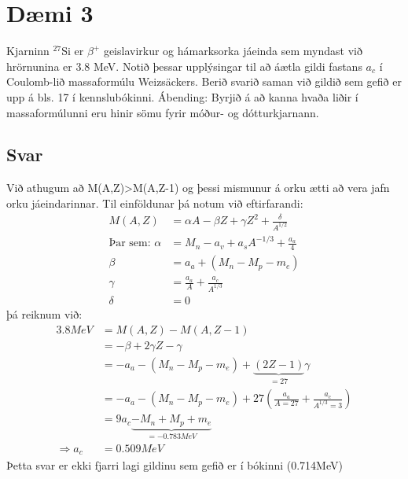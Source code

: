 \documentclass[11pt]{article}
\newcommand{\explain}[2]{\underbrace{#1}_\textrm{$#2$}}
\begin{document}
\section*{Dæmi 3}
Kjarninn $^27$Si er $β^+$ geislavirkur og hámarksorka jáeinda sem myndast við hrörnunina er 3.8 MeV. Notið þessar upplýsingar til að áætla gildi fastans $a_c$ í Coulomb-lið massaformúlu Weizsäckers. Berið svarið saman við gildið sem gefið er upp á bls. 17 í kennslubókinni. Ábending: Byrjið á að kanna hvaða liðir í massaformúlunni eru hinir sömu fyrir móður- og dótturkjarnann.

\subsection*{Svar}
Við athugum að M(A,Z)>M(A,Z-1) og þessi mismunur á orku ætti að vera jafn orku jáeindarinnar. Til einföldunar þá notum við eftirfarandi:
\begin{align*}
    M(A,Z) &= \alpha A - \beta Z + \gamma Z^2 + \frac{\delta}{A^{1/2}}\\
    \text{Þar sem:   } \alpha  &= M_n -a_v +a_sA^{-1/3} + \frac{a_a}{4}\\
                    \beta   &= a_a + (M_n - M_p - m_e)\\
                    \gamma  &= \frac{a_a}{A} + \frac{a_c}{A^{1/3}}\\
                    \delta  &= 0
\end{align*}
þá reiknum við:
\begin{align*}
   3.8MeV   &= M(A,Z)-M(A,Z-1) \\
            &=-\beta + 2\gamma Z - \gamma\\
            &= -a_a - (M_n - M_p - m_e) +\explain{(2Z-1)}{=27}\gamma\\
            &= -a_a - (M_n - M_p - m_e) + 27\left(\frac{a_a}{A=27}+\frac{a_c}{A^{1/3}=3}\right)\\
            &= 9a_c \explain{- M_n + M_p + m_e}{= -0.783 MeV}\\
            \Rightarrow a_c &= 0.509 MeV
\end{align*}
Þetta svar er ekki fjarri lagi gildinu sem gefið er í bókinni (0.714MeV)
\end{document}
